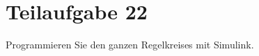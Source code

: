 \section{Teilaufgabe 22}
\begin{aufgabe}
Programmieren Sie den ganzen Regelkreises mit Simulink.
\end{aufgabe}
